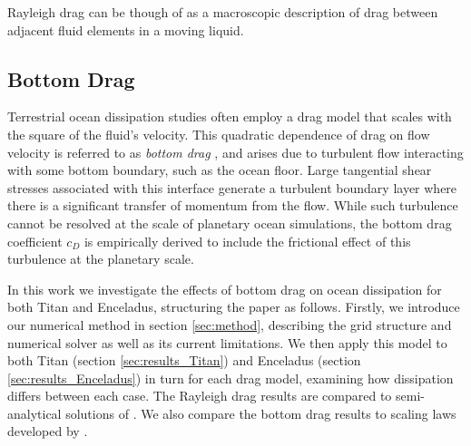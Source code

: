 Rayleigh drag can be though of as a macroscopic description of drag between adjacent fluid elements in a moving liquid.

\subsection{Bottom Drag}

Terrestrial ocean dissipation studies often employ a drag model that scales with the square of the fluid's velocity. This quadratic dependence of drag on flow velocity is referred to as \textit{bottom drag} \citep{gill1982atmosphere}, and arises due to turbulent flow interacting with some bottom boundary, such as the ocean floor. Large tangential shear stresses associated with this interface generate a turbulent boundary layer where there is a significant transfer of momentum from the flow. While such turbulence cannot be resolved at the scale of planetary ocean simulations, the bottom drag coefficient $c_D$ is empirically derived to include the frictional effect of this turbulence at the planetary scale.

In this work we investigate the effects of bottom drag on ocean dissipation for both Titan and Enceladus, structuring the paper as follows. Firstly, we introduce our numerical method in section \ref{sec:method}, describing the grid structure and numerical solver as well as its current limitations. We then apply this model to both Titan (section \ref{sec:results_Titan}) and Enceladus (section \ref{sec:results_Enceladus}) in turn for each drag model, examining how dissipation differs between each case. The Rayleigh drag results are compared to semi-analytical solutions of \citet{matsuyama2014tidal}. We also compare the bottom drag results to scaling laws developed by \citet{chen2013tidal}.






